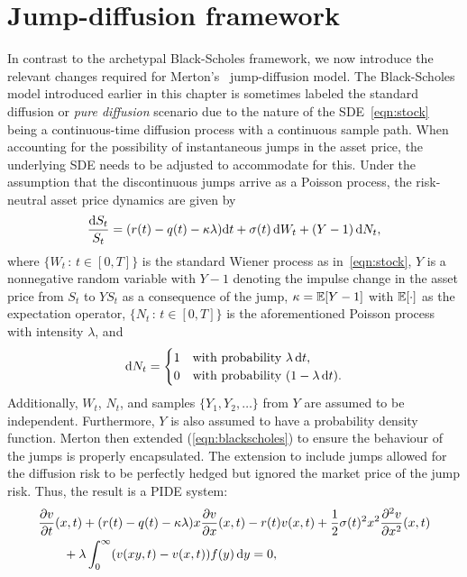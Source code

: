 \section{Jump-diffusion framework}
In contrast to the archetypal Black-Scholes framework, we now introduce the relevant changes required for Merton's~\cite{Merton1976} jump-diffusion model. The Black-Scholes model introduced earlier in this chapter is sometimes labeled the standard diffusion or \emph{pure diffusion} scenario due to the nature of the SDE~\eqref{eqn:stock} being a continuous-time diffusion process with a continuous sample path. When accounting for the possibility of instantaneous jumps in the asset price, the underlying SDE needs to be adjusted to accommodate for this. Under the assumption that the discontinuous jumps arrive as a Poisson process, the risk-neutral asset price dynamics are given by
	\begin{equation}
		\label{eqn:assetPriceDynamics}
		\frac{\mathrm d S_t}{S_t} = (r(t) - q(t) - \kappa\lambda)\mathrm d t + \sigma(t) \, \mathrm d W_t + (Y - 1) \, \mathrm d N_t,
	\end{equation}
where $\{W_t \, : \, t \in [0,T]\}$ is the standard Wiener process as in~\eqref{eqn:stock}, $Y$ is a nonnegative random variable with $Y-1$ denoting the impulse change in the asset price from $S_t$ to $YS_t$ as a consequence of the jump, $\kappa = \mathbb E[Y-1]$ with $\mathbb E[\cdot]$ as the expectation operator, $\{N_t \, : \, t \in [0,T]\}$ is the aforementioned Poisson process with intensity $\lambda$, and
	\begin{equation}
		\label{eqn:dNProb}
		\mathrm d N_t = \begin{cases}
			1 &\mbox{with probability } \lambda \, \mathrm d t, \\
			0 &\mbox{with probability } (1 - \lambda \, \mathrm d t).
		\end{cases}
	\end{equation}
Additionally, $W_t$, $N_t$, and samples $\{Y_1,Y_2,\hdots\}$ from $Y$ are assumed to be independent. Furthermore, $Y$ is also assumed to have a probability density function. Merton then extended (\ref{eqn:blackscholes}) to ensure the behaviour of the jumps is properly encapsulated. The extension to include jumps allowed for the diffusion risk to be perfectly hedged but ignored the market price of the jump risk. Thus, the result is a PIDE system:
	\begin{align}
		\label{eqn:PIDE}
		\begin{split}
			&\frac{\partial v}{\partial t}(x,t) + (r(t) - q(t) - \kappa\lambda)x\frac{\partial v}{\partial x}(x,t) - r(t)v(x,t) + \frac{1}{2}\sigma(t)^2x^2\frac{\partial^2 v}{\partial x^2}(x,t) \\
			& \qquad + \lambda \int_0^\infty (v(xy,t) - v(x,t))f(y) \, \mathrm d y = 0,
		\end{split}
	\end{align}
